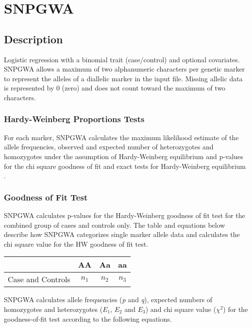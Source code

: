 \section{SNPGWA}
\label{sec:snpgwa}
\subsection{Description}
Logistic regression with a binomial trait (case/control) and optional
covariates.  SNPGWA allows a maximum of two alphanumeric characters per genetic
marker to represent the alleles of a diallelic marker in the input file.
Missing allelic data is represented by 0 (zero) and does not count toward the
maximum of two characters.

\subsubsection{Hardy-Weinberg Proportions Tests}
For each marker, SNPGWA calculates the maximum likelihood estimate of the allele
frequencies, observed and expected number of heterozygotes and homozygotes under
the assumption of Hardy-Weinberg equilibrium and p-values for the chi square
goodness of fit and exact tests for Hardy-Weinberg equilibrium \cite{Guo92}.

\subsubsection{Goodness of Fit Test}
\label{goodness-of-fit}
SNPGWA calculates p-values for the Hardy-Weinberg goodness of fit test for the
combined group of cases and controls only.  The table and equations below
describe how SNPGWA categorizes single marker allele data and calculates the chi
square value for the HW goodness of fit test.

\vspace{1em}
\begin{tabular}{rccc}
  \hline
  {} & \textbf{AA} & \textbf{Aa} & \textbf{aa} \\
  \hline
  Case and Controls & $n_1$ & $n_2$ & $n_3$ \\
  \hline
\end{tabular}
\vspace{1em}

SNPGWA calculates allele frequencies (\textit{p} and \textit{q}), expected
numbers of homozygotes and heterozygotes ($E_1$, $E_2$ and $E_3$) and chi square
value ($\chi^2$) for the goodness-of-fit test according to the following
equations.

